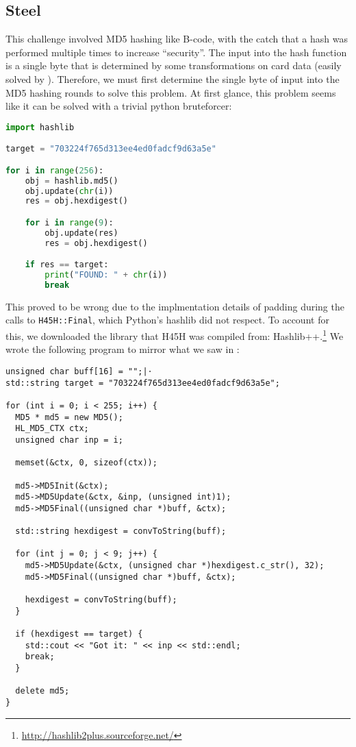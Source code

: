 \subsection{Steel}
This challenge involved MD5 hashing like B-code, with the catch that a hash was performed multiple times to increase ``security''. The input into the hash function is a single byte that is determined by some transformations on card data (easily solved by \angr). Therefore, we must first determine the single byte of input into the MD5 hashing rounds to solve this problem. At first glance, this problem seems like it can be solved with a trivial python bruteforcer:

\begin{lstlisting}[language=python]
import hashlib

target = "703224f765d313ee4ed0fadcf9d63a5e"

for i in range(256):
    obj = hashlib.md5()
    obj.update(chr(i))
    res = obj.hexdigest()

    for i in range(9):
        obj.update(res)
        res = obj.hexdigest()

    if res == target:
        print("FOUND: " + chr(i))
        break
\end{lstlisting}

This proved to be wrong due to the implmentation details of padding during the calls to \texttt{H45H::Final}, which Python's hashlib did not respect. To account for this, we downloaded the library that H45H was compiled from: Hashlib++.\footnote{\url{http://hashlib2plus.sourceforge.net/}}
We wrote the following program to mirror what we saw in \ghidra:

\begin{lstlisting}
unsigned char buff[16] = "";|⋅
std::string target = "703224f765d313ee4ed0fadcf9d63a5e";

for (int i = 0; i < 255; i++) {
  MD5 * md5 = new MD5();
  HL_MD5_CTX ctx;
  unsigned char inp = i;

  memset(&ctx, 0, sizeof(ctx));

  md5->MD5Init(&ctx);
  md5->MD5Update(&ctx, &inp, (unsigned int)1);
  md5->MD5Final((unsigned char *)buff, &ctx);

  std::string hexdigest = convToString(buff);

  for (int j = 0; j < 9; j++) {
    md5->MD5Update(&ctx, (unsigned char *)hexdigest.c_str(), 32);
    md5->MD5Final((unsigned char *)buff, &ctx);

    hexdigest = convToString(buff);
  }

  if (hexdigest == target) {
    std::cout << "Got it: " << inp << std::endl;
    break;
  }

  delete md5;
}
\end{lstlisting}

